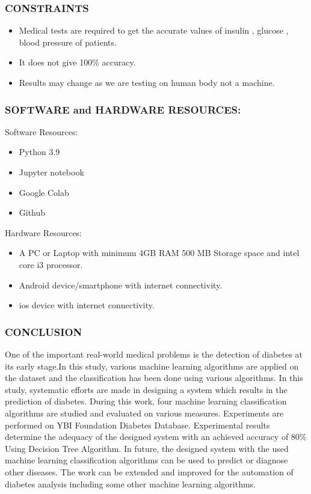 \documentclass{beamer}
\begin{document}
\begin{frame}
\frametitle{\bf CONSTRAINTS}

\begin{itemize}
    \item Medical tests are required to get the accurate values of insulin , glucose ,
blood pressure of patients.
    \item It does not give 100\% accuracy.
    \item Results may change as we are testing on human body not a machine.
  \end{itemize}
\end{frame}

\begin{frame}
\frametitle{\bf SOFTWARE and HARDWARE RESOURCES:}
  \begin{block}
    {}
    Software Resources:
  \end{block}
  \begin{itemize}
    \item Python 3.9
    \item Jupyter notebook
    \item Google Colab
    \item Github
  \end{itemize}
  \begin{block}
    {}
    Hardware Resources:
  \end{block}
  \begin{itemize}
    \item A PC or Laptop with minimum 4GB RAM
    500 MB Storage space and intel core i3 processor.
    \item Android device/smartphone with internet connectivity.
    \item ios device with internet connectivity.
  \end{itemize}
  
\end{frame}

\begin{frame}
\frametitle{\bf CONCLUSION}
    \normalsize{One of the important real-world medical problems is the detection of diabetes
at its early stage.In this study, various machine learning algorithms are applied on the dataset and the classification has been done
using various algorithms. In this study, systematic efforts are made in designing
a system which results in the prediction of diabetes. During this work,
four machine learning classification algorithms are studied and evaluated on
various measures. Experiments are performed on YBI Foundation Diabetes Database.
Experimental results determine the adequacy of the designed system with
an achieved accuracy of 80\% Using Decision Tree Algorithm. In future, the
designed system with the used machine learning classification algorithms
can be used to predict or diagnose other diseases. The work can be extended
and improved for the automation of diabetes analysis including some other
machine learning algorithms.}
\end{frame}
\end{document}
